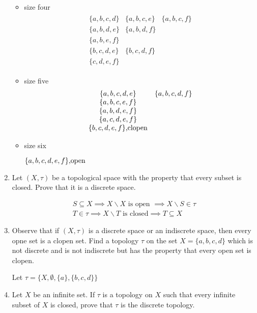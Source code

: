 \documentclass[10pt,a4paper]{report}
\begin{document}
\begin{enumerate}
\begin{itemize}
	\item size four
	\begin{align*}
		\begin{array}{ccc}
			\{a,b,c,d\} & \{a,b,c,e\} & \{a,b,c,f\}\\
			\{a,b,d,e\} & \{a,b,d,f\}\\
			\{a,b,e,f\}\\
			\{b,c,d,e\} & \{b,c,d,f\}\\
			\{c,d,e,f\}
		\end{array}
	\end{align*}
	
	\item size five
	\begin{align*}
		\begin{array}{cc}
			\{a,b,c,d,e\} & \{a,b,c,d,f\} \\
			\{a,b,c,e,f\}\\
			\{a,b,d,e,f\}\\
			\{a,c,d,e,f\}\\
			\{b,c,d,e,f\}\text{,clopen}
		\end{array}
	\end{align*}
	
	\item size six
	
		$\{a,b,c,d,e,f\}\text{,open}$
\end{itemize}

\newpage
\item Let $(X,\tau)$ be a topological space with the property that every subset is closed.  Prove that it is a discrete space.

\begin{align*}
	S \subseteq X \implies X\backslash X \text{ is open } \implies X\backslash S \in \tau \\
	T \in \tau \implies X\backslash T \text{ is closed} \implies T \subseteq X
\end{align*}

\item Observe that if $(X,\tau)$ is a discrete space or an indiscrete space, then every opne set is a clopen set.  Find a topology $\tau$ on the set $X=\{a,b,c,d\}$ which is not discrete and is not indiscrete but has the property that every open set is clopen.

Let $\tau = \{X, \emptyset, \{a\}, \{b,c,d\}\}$

\item Let $X$ be an infinite set.  If $\tau$ is a topology on $X$ such that every infinite subset of $X$ is closed, prove that $\tau$ is the discrete topology.


\end{enumerate}
\end{document}
